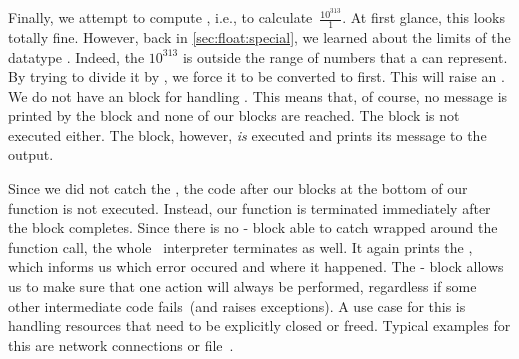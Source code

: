 Finally, we attempt to compute , i.e., to calculate~$\frac{10^{313}}{1}$.
At first glance, this looks totally fine.
However, back in \cref{sec:float:special}, we learned about the limits of the datatype .
Indeed, the  $10^{313}$ is outside the range of numbers that a  can represent.
By trying to divide it by , we force it to be converted to  first.
This will raise an .
We do not have an  block for handling .
This means that, of course, no message is printed by the  block and none of our  blocks are reached.
The  block is not executed either.
The  block, however, \emph{is} executed and prints its message to the output.

Since we did not catch the , the code after our blocks at the bottom of our function is not executed.
Instead, our function is terminated immediately after the  block completes.
Since there is no - block able to catch  wrapped around the function call, the whole \python\ interpreter terminates as well.
It again prints the , which informs us which error occured and where it happened.%
%
\FloatBarrier%
\endhsection%
%
%
%
\label{sec:withAndContextManagers}%
%
%
%
%
%
%
%
%
The - block allows us to make sure that one action will always be performed, regardless if some other intermediate code fails~(and raises exceptions).
A use case for this is handling resources that need to be explicitly closed or freed.
Typical examples for this are network connections or file~.

